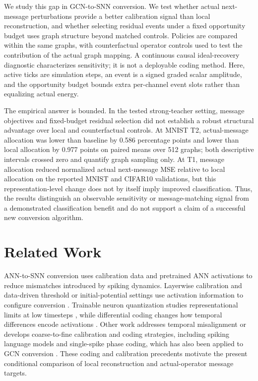 \documentclass[11pt]{article}
\begin{document}
We study this gap in GCN-to-SNN conversion. We test whether actual next-message perturbations provide a better calibration signal than local reconstruction, and whether selecting residual events under a fixed opportunity budget uses graph structure beyond matched controls. Policies are compared within the same graphs, with counterfactual operator controls used to test the contribution of the actual graph mapping. A continuous causal ideal-recovery diagnostic characterizes sensitivity; it is not a deployable coding method. Here, active ticks are simulation steps, an event is a signed graded scalar amplitude, and the opportunity budget bounds extra per-channel event slots rather than equalizing actual energy.

The empirical answer is bounded. In the tested strong-teacher setting, message objectives and fixed-budget residual selection did not establish a robust structural advantage over local and counterfactual controls. At MNIST T2, actual-message allocation was lower than baseline by 0.586 percentage points and lower than local allocation by 0.977 points on paired means over 512 graphs; both descriptive intervals crossed zero and quantify graph sampling only. At T1, message allocation reduced normalized actual next-message MSE relative to local allocation on the reported MNIST and CIFAR10 validations, but this representation-level change does not by itself imply improved classification. Thus, the results distinguish an observable sensitivity or message-matching signal from a demonstrated classification benefit and do not support a claim of a successful new conversion algorithm.

\section{Related Work}

ANN-to-SNN conversion uses calibration data and pretrained ANN activations to reduce mismatches introduced by spiking dynamics. Layerwise calibration and data-driven threshold or initial-potential settings use activation information to configure conversion \citep{li2021,bojkovic2024}. Trainable neuron quantization studies representational limits at low timesteps \citep{atif2023}, while differential coding changes how temporal differences encode activations \citep{huang2025}. Other work addresses temporal misalignment \citep{bojkovic2025} or develops coarse-to-fine calibration and coding strategies, including spiking language models \citep{fas2025} and single-spike phase coding, which has also been applied to GCN conversion \citep{onespike2024}. These coding and calibration precedents motivate the present conditional comparison of local reconstruction and actual-operator message targets.
\end{document}
